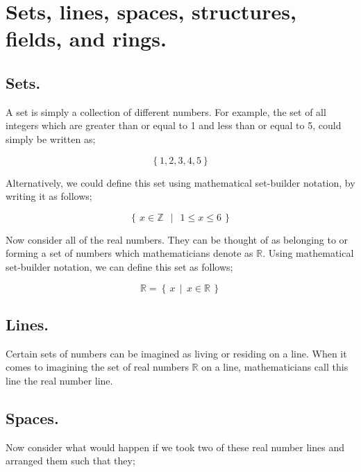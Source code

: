 \chapter{Sets, lines, spaces, structures, fields, and rings.}

\section{Sets.}

A set is simply a collection of different numbers. For example, the set of all integers which are greater than or equal
to 1 and less than or equal to 5, could simply be written as;

\begin{equation*}
    \left\{1,2,3,4,5\right\}
\end{equation*}
\vspace{0\baselineskip}

Alternatively, we could define this set using mathematical set-builder notation, by writing it as follows;

\begin{equation*}
    \left\{ \, x \in \mathbb{Z}\;\, \mid \;\, 1 \leq x \leq 6 \, \right\}
\end{equation*}
\vspace{0\baselineskip}

Now consider all of the real numbers. They can be thought of as belonging to or forming a set of numbers which
mathematicians denote as \(\mathbb{R}\). Using mathematical set-builder notation, we can define this set as follows;

\begin{equation*}
    \mathbb{R} = \left\{ \, x \;\, | \;\, x \in \mathbb{R} \, \right\}
\end{equation*}


\section{Lines.}

Certain sets of numbers can be imagined as living or residing on a line. When it comes to imagining the set of real
numbers \(\mathbb{R}\) on a line, mathematicians call this line the real number line.


\section{Spaces.}

Now consider what would happen if we took two of these real number lines and arranged them such that they;

